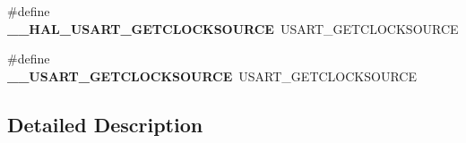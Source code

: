 \begin{DoxyCompactItemize}
\item 
\#define {\bfseries \+\_\+\+\_\+\+H\+A\+L\+\_\+\+U\+S\+A\+R\+T\+\_\+\+G\+E\+T\+C\+L\+O\+C\+K\+S\+O\+U\+R\+CE}~U\+S\+A\+R\+T\+\_\+\+G\+E\+T\+C\+L\+O\+C\+K\+S\+O\+U\+R\+CE\hypertarget{group___h_a_l___u_s_a_r_t___aliased___macros_ga0ed768f9a18f877413306078c442a2a5}{}\label{group___h_a_l___u_s_a_r_t___aliased___macros_ga0ed768f9a18f877413306078c442a2a5}

\item 
\#define {\bfseries \+\_\+\+\_\+\+U\+S\+A\+R\+T\+\_\+\+G\+E\+T\+C\+L\+O\+C\+K\+S\+O\+U\+R\+CE}~U\+S\+A\+R\+T\+\_\+\+G\+E\+T\+C\+L\+O\+C\+K\+S\+O\+U\+R\+CE\hypertarget{group___h_a_l___u_s_a_r_t___aliased___macros_gaa00a53bf6bc2bee096abb57d4ace2384}{}\label{group___h_a_l___u_s_a_r_t___aliased___macros_gaa00a53bf6bc2bee096abb57d4ace2384}

\end{DoxyCompactItemize}


\subsection{Detailed Description}
